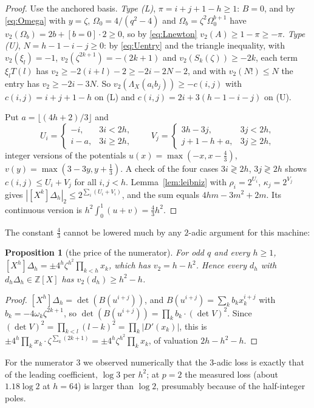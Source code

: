 \documentclass[11pt]{amsart}
\newtheorem{proposition}[theorem]{Proposition}
\theoremstyle{definition}
\theoremstyle{remark}
\numberwithin{equation}{section}
\newcommand{\ZZ}{\mathbb{Z}}
\begin{document}
\begin{proof}
Use the anchored basis. \emph{Type (L)}, $\pi=i+j+1-h\ge1$: $B=0$, and by \eqref{eq:Omega} with $y=\zeta$,
$\Omega_0=4/(q^2-4)$ and $\Omega_b=\zeta^2\Omega_0^{b+1}$ have $v_2(\Omega_b)=2b+[b=0]\cdot2\ge0$, so by \eqref{eq:Lnewton}
$v_2(A)\ge1-\pi\ge-\pi$. \emph{Type (U)}, $N=h-1-i-j\ge0$: by \eqref{eq:Uentry} and the triangle inequality, with
$v_2(\xi_l)=-1$, $v_2(\zeta^{2k+1})=-(2k+1)$ and $v_2(S_k(\zeta))\ge-2k$, each term $\xi_lT(l)$ has
$v_2\ge-2(i+l)-2\ge-2i-2N-2$, and with $v_2(N!)\le N$ the entry has $v_2\ge-2i-3N$. So $v_2(\Lambda_X(a_ib_j))\ge-c(i,j)$ with
$c(i,j)=i+j+1-h$ on (L) and $c(i,j)=2i+3(h-1-i-j)$ on (U).

Put $a=\lfloor(4h+2)/3\rfloor$ and
\[
  U_i=\begin{cases}-i,&3i<2h,\\ i-a,&3i\ge2h,\end{cases}\qquad
  V_j=\begin{cases}3h-3j,&3j<2h,\\ j+1-h+a,&3j\ge2h,\end{cases}
\]
integer versions of the potentials $u(x)=\max(-x,x-\frac43)$, $v(y)=\max(3-3y,y+\frac13)$. A check of the four cases
$3i\gtrless2h$, $3j\gtrless2h$ shows $c(i,j)\le U_i+V_j$ for all $i,j<h$. Lemma~\ref{lem:leibniz} with $\rho_i=2^{U_i}$,
$\kappa_j=2^{V_j}$ gives $|[X^k]\Delta_h|_2\le2^{\sum_i(U_i+V_i)}$, and the sum equals $4hm-3m^2+2m$. Its continuous version
is $h^2\int_0^1(u+v)=\frac43h^2$.
\end{proof}

The constant $\frac43$ cannot be lowered much by any $2$-adic argument for this machine:

\begin{proposition}[the price of the numerator]\label{prop:floor}
For odd $q$ and every $h\ge1$, $[X^h]\Delta_h=\pm4^h\zeta^{h^2}\prod_{k<h}x_k$, which has $v_2=h-h^2$. Hence every $d_h$
with $d_h\Delta_h\in\ZZ[X]$ has $v_2(d_h)\ge h^2-h$.
\end{proposition}

\begin{proof}
$[X^h]\Delta_h=\det(B(u^{i+j}))$, and $B(u^{i+j})=\sum_kb_kx_k^{i+j}$ with $b_k=-4\omega_k\zeta^{2k+1}$, so
$\det(B(u^{i+j}))=\prod_kb_k\cdot(\det V)^2$. Since $(\det V)^2=\prod_{k<l}(l-k)^2=\prod_k|D'(x_k)|$, this is
$\pm4^h\prod_kx_k\cdot\zeta^{\sum_k(2k+1)}=\pm4^h\zeta^{h^2}\prod_kx_k$, of valuation $2h-h^2-h$.
\end{proof}

For the numerator $3$ we observed numerically that the $3$-adic loss is exactly that of the leading coefficient, $\log3$
per $h^2$; at $p=2$ the measured loss (about $1.18\log2$ at $h=64$) is larger than $\log2$, presumably because of the
half-integer poles.
\end{document}
